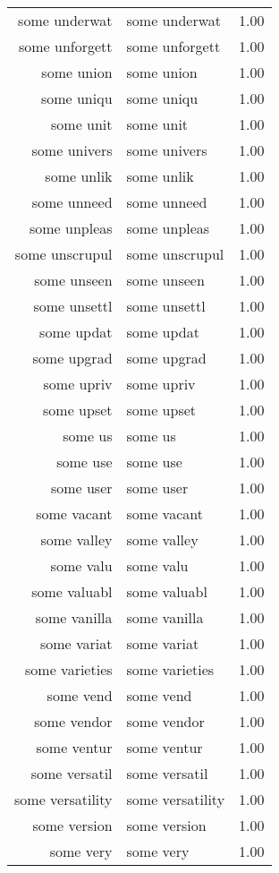 \begin{table}[ht]
\begin{tabular}{rlr}
  some underwat & some underwat & 1.00 \\ 
  some unforgett & some unforgett & 1.00 \\ 
  some union & some union & 1.00 \\ 
  some uniqu & some uniqu & 1.00 \\ 
  some unit & some unit & 1.00 \\ 
  some univers & some univers & 1.00 \\ 
  some unlik & some unlik & 1.00 \\ 
  some unneed & some unneed & 1.00 \\ 
  some unpleas & some unpleas & 1.00 \\ 
  some unscrupul & some unscrupul & 1.00 \\ 
  some unseen & some unseen & 1.00 \\ 
  some unsettl & some unsettl & 1.00 \\ 
  some updat & some updat & 1.00 \\ 
  some upgrad & some upgrad & 1.00 \\ 
  some upriv & some upriv & 1.00 \\ 
  some upset & some upset & 1.00 \\ 
  some us & some us & 1.00 \\ 
  some use & some use & 1.00 \\ 
  some user & some user & 1.00 \\ 
  some vacant & some vacant & 1.00 \\ 
  some valley & some valley & 1.00 \\ 
  some valu & some valu & 1.00 \\ 
  some valuabl & some valuabl & 1.00 \\ 
  some vanilla & some vanilla & 1.00 \\ 
  some variat & some variat & 1.00 \\ 
  some varieties & some varieties & 1.00 \\ 
  some vend & some vend & 1.00 \\ 
  some vendor & some vendor & 1.00 \\ 
  some ventur & some ventur & 1.00 \\ 
  some versatil & some versatil & 1.00 \\ 
  some versatility & some versatility & 1.00 \\ 
  some version & some version & 1.00 \\ 
  some very & some very & 1.00 \\ 

\end{tabular}
\end{table}
